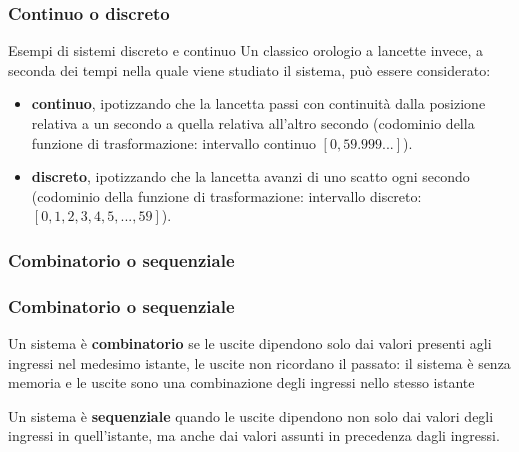 \begin{frame}
	\frametitle{Continuo o discreto}
	
	\begin{block}{Esempi di sistemi discreto e continuo}		
		Un classico orologio a lancette invece, a seconda dei tempi nella quale viene studiato il sistema, può essere considerato:
		\begin{itemize}
			\item \textbf{continuo}, ipotizzando che la lancetta passi con continuità dalla posizione relativa a un secondo a quella relativa all'altro secondo (codominio della funzione di trasformazione: intervallo continuo $[0, 59.999...]$).
			\item \textbf{discreto}, ipotizzando che la lancetta avanzi di uno scatto ogni secondo (codominio della funzione di trasformazione: intervallo discreto: $[0, 1, 2, 3, 4, 5, ..., 59]$).
		\end{itemize}
	\end{block}	
\end{frame}



\subsubsection[Combinatorio o sequenziale]{Combinatorio o sequenziale}
\begin{frame}
	\frametitle{Combinatorio o sequenziale}
	\begin{block}{Un sistema è \textbf{combinatorio}}
		se le uscite dipendono solo dai valori presenti agli ingressi nel medesimo istante, le uscite non ricordano il passato: il sistema è senza memoria e le uscite sono una combinazione degli ingressi nello stesso istante
	\end{block}
	
	\begin{block}{Un sistema è \textbf{sequenziale}}
		quando le uscite dipendono non solo dai valori degli ingressi in quell'istante, ma anche dai valori assunti in precedenza dagli ingressi.
	\end{block}
	
	
\end{frame}


